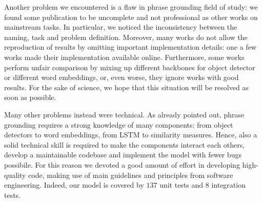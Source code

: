 Another problem we encountered is a flaw in phrase grounding field of
study: we found some publication to be uncomplete and not professional
as other works on mainstream tasks. In particular, we noticed the
inconsistency between the naming, task and problem definition.
Moreover, many works do not allow the reproduction of results by
omitting important implementation details: one a few works made their
implementation available online. Furthermore, some works perform
unfair comparison by mixing up different backbones for object detector
or different word embeddings, or, even worse, they ignore works with
good results. For the sake of science, we hope that this situation
will be resolved as soon as possible.

Many other problems instead were technical. As already pointed out,
phrase grounding requires a strong knowledge of many components: from
object detectors to word embeddings, from LSTM to similarity measures.
Hence, also a solid technical skill is required to make the components
interact each others, develop a maintainable codebase and implement
the model with fewer bugs possibile. For this reason we devoted a good
amount of effort in developing high-quality code, making use of main
guidelines and principles from software engineering. Indeed, our model
is covered by $137$ unit tests and $8$ integration tests.
